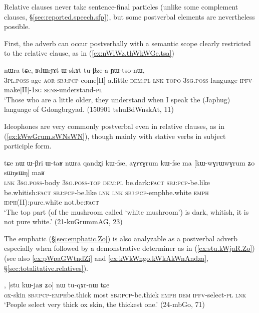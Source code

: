 Relative clauses never take sentence-final particles (unlike some complement clauses, §\ref{sec:reported.speech.sfp}), but some postverbal elements are nevertheless possible. 

First, the adverb  can occur postverbally with a semantic scope clearly restricted to the relative clause, as in (\ref{ex:nWlWz.thWkWGe.tsa}) 

\begin{exe}
\ex \label{ex:nWlWz.thWkWGe.tsa}
 nɯra tɕe, ʁdɯrɟɤt ɯ-skɤt tu-βze-a ɲɯ-tso-nɯ, \\
\textsc{3pl}.\textsc{poss}-age \textsc{aor}-\textsc{sbj}:\textsc{pcp}-come[II] a.little \textsc{dem}:\textsc{pl} \textsc{lnk}  \textsc{topo} \textsc{3sg}.\textsc{poss}-language \textsc{ipfv}-make[II]-\textsc{1sg} \textsc{sens}-understand-\textsc{pl} \\
\glt `Those who are a little older, they understand when I speak the (Japhug) language of Gdongbrgyad. (150901 tshuBdWnskAt, 11)
\end{exe} 

Ideophones are very commonly postverbal even in relative clauses, as in (\ref{ex:kWwGrum.sWNsWN}), though mainly with stative verbs in subject participle form.

\begin{exe}
\ex \label{ex:kWwGrum.sWNsWN}
\gll tɕe nɯ ɯ-βri ɯ-taʁ nɯra qandʐi kɯ-fse, aɣrɤɣrum kɯ-fse  ma [kɯ-wɣrɯ\redp{}wɣrum ʑo sɯŋsɯŋ] maʁ \\
\textsc{lnk} \textsc{3sg}.\textsc{poss}-body \textsc{3sg}.\textsc{poss}-\textsc{top} \textsc{dem}:\textsc{pl} be.dark:\textsc{fact} \textsc{sbj}:\textsc{pcp}-be.like be.whitish:\textsc{fact} \textsc{sbj}:\textsc{pcp}-be.like \textsc{lnk} \textsc{lnk} \textsc{sbj}:\textsc{pcp}-emph\redp{}be.white \textsc{emph} \textsc{idph}(II):pure.white not.be:\textsc{fact} \\
\glt `The top part (of the mushroom called  `white mushroom') is dark, whitish, it is not pure white.' (21-kuGrummAG, 23)
\end{exe} 

The emphatic  (§\ref{sec:emphatic.Zo}) is also analyzable as a postverbal adverb especially when followed by a demonstrative determiner as in (\ref{ex:stu.kWjaR.Zo}) (see also \ref{ex:pWpaGWtndZi} and \ref{ex:kWkWngo.kWkAkWnAndza}, §\ref{sec:totalitative.relatives}).

\begin{exe}
\ex \label{ex:stu.kWjaR.Zo}
, [stu kɯ-jaʁ ʑo] nɯ tu-qɤr-nɯ tɕe \\
ox-skin \textsc{sbj}:\textsc{pcp}-\textsc{emph}\redp{}be.thick most \textsc{sbj}:\textsc{pcp}-be.thick \textsc{emph} \textsc{dem} \textsc{ipfv}-select-\textsc{pl} \textsc{lnk} \\
\glt `People select very thick ox skin, the thickest one.' (24-mbGo, 71)
\end{exe} 


